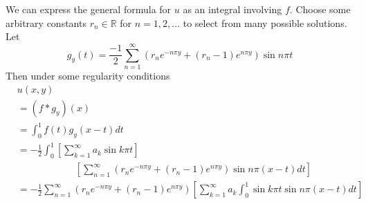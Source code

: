 \documentclass[oneside]{article}
\newcommand\bbR{\mathbb{R}}
\begin{document}
  We can express the general formula for $u$ as an integral involving $f$. Choose some arbitrary constants $r_n \in \bbR$ for $n = 1, 2, \dots$ to select from many possible solutions. Let \[
    g_y(t) = \frac{-1}{2} \sum_{n=1}^\infty \left(r_n e^{-n \pi y} + (r_n - 1)e^{n \pi y} \right) \sin n \pi t
  \] Then under some regularity conditions \begin{align*}
    &u(x, y) \\
    &= (f * g_y)(x) \\
    &= \int_0^1 f(t) g_y(x-t) dt \\
    &= -\frac12 \int_0^1 \left[\sum_{k=1}^\infty a_k \sin k \pi t\right] \\
    &\qquad\qquad\qquad\left[\sum_{n=1}^\infty \left(r_n e^{-n \pi y} + (r_n - 1)e^{n \pi y} \right) \sin n \pi (x-t) dt\right] \\
    &= -\frac12
    \sum_{n=1}^\infty \left(r_n e^{-n \pi y} + (r_n - 1)e^{n \pi y} \right) \left[\sum_{k=1}^\infty a_k \int_0^1 \sin k \pi t \sin n \pi (x-t) dt\right] \\
  \end{align*}
\end{document}
